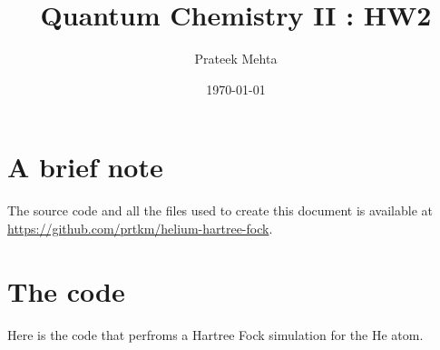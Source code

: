 \documentclass[11pt]{article}
\author{Prateek Mehta}
\date{\today}
\title{Quantum Chemistry II : HW2}
\begin{document}
\maketitle


\section{A brief note}
\label{sec-1}

The source code and all the files used to create this document is available at \url{https://github.com/prtkm/helium-hartree-fock}.

\section{The code}
\label{sec-2}

Here is the code that perfroms a Hartree Fock simulation for the He atom.
\end{document}
